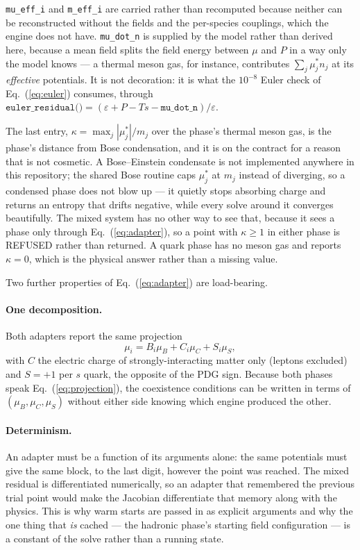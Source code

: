 \documentclass[aps,prc,onecolumn,superscriptaddress,nofootinbib,10pt]{revtex4-2}
\newcommand{\muB}{\mu_B}
\newcommand{\muC}{\mu_C}
\newcommand{\muS}{\mu_S}
\begin{document}
\noindent
\texttt{mu\_eff\_i} and \texttt{m\_eff\_i} are carried rather than
recomputed because neither can be reconstructed without the fields and the
per-species couplings, which the engine does not have.
\texttt{mu\_dot\_n} is supplied by the model rather than derived here, because
a mean field splits the field energy between $\mu$ and $P$ in a way only the
model knows --- a thermal meson gas, for instance, contributes
$\sum_j \mu^{*}_j n_j$ at its \emph{effective} potentials. It is not
decoration: it is what the $10^{-8}$ Euler check of Eq.~(\ref{eq:euler})
consumes, through
$\texttt{euler\_residual()} = (\varepsilon + P - Ts -
\texttt{mu\_dot\_n})/\varepsilon$.

The last entry, $\kappa = \max_j |\mu^{*}_j| / m_j$ over the phase's thermal
meson gas, is the phase's distance from Bose condensation, and it is on the
contract for a reason that is not cosmetic. A Bose--Einstein condensate is not
implemented anywhere in this repository; the shared Bose routine caps
$\mu^{*}_j$ at $m_j$ instead of diverging, so a condensed phase does not blow
up --- it quietly stops absorbing charge and returns an entropy that drifts
negative, while every solve around it converges beautifully. The mixed system
has no other way to see that, because it sees a phase only through
Eq.~(\ref{eq:adapter}), so a point with $\kappa \ge 1$ in either phase is
REFUSED rather than returned. A quark phase has no meson gas and reports
$\kappa = 0$, which is the physical answer rather than a missing value.

Two further properties of Eq.~(\ref{eq:adapter}) are load-bearing.

\paragraph{One decomposition.} Both adapters report the same projection
%
\begin{equation}
\mu_i = B_i \muB + C_i \muC + S_i \muS ,
\label{eq:projection}
\end{equation}
%
with $C$ the electric charge of strongly-interacting matter only (leptons
excluded) and $S = +1$ per $s$ quark, the opposite of the PDG sign. Because
both phases speak Eq.~(\ref{eq:projection}), the coexistence conditions can
be written in terms of $(\muB, \muC, \muS)$ without either side knowing which
engine produced the other.

\paragraph{Determinism.} An adapter must be a function of its arguments
alone: the same potentials must give the same block, to the last digit,
however the point was reached. The mixed residual is differentiated
numerically, so an adapter that remembered the previous trial point would
make the Jacobian differentiate that memory along with the physics. This is
why warm starts are passed in as explicit arguments and why the one thing
that \emph{is} cached --- the hadronic phase's starting field configuration
--- is a constant of the solve rather than a running state.
\end{document}
